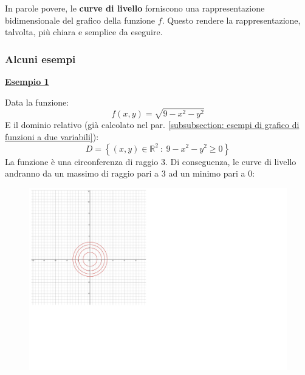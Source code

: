\documentclass[a4paper]{article}
\newcommand{\definition}[1]{\textcolor{Red3}{\textbf{#1}}}
\newcommand{\example}[1]{\textcolor{Green4}{\textbf{#1}}}
\begin{document}
	\noindent
	In parole povere, le \definition{curve di livello} forniscono una rappresentazione bidimensionale del grafico della funzione $f$. Questo rendere la rappresentazione, talvolta, più chiara e semplice da eseguire.\newpage

	\subsubsection{Alcuni esempi}\label{subsubsection: alcuni esempi}

	\begin{flushleft}
		\example{\underline{Esempio 1}}
	\end{flushleft}
	Data la funzione:
	\begin{equation*}
		f\left(x,y\right) = \sqrt{9-x^{2} -y^{2}}
	\end{equation*}
	E il dominio relativo (già calcolato nel par. \ref{subsubsection: esempi di grafico di funzioni a due variabili}):
	\begin{equation*}
		D = \left\{\left(x,y\right) \in \mathbb{R}^{2} \: : \: 9 - x^{2} - y^{2} \ge 0 \right\}
	\end{equation*}
	La funzione è una circonferenza di raggio $3$. Di conseguenza, le curve di livello andranno da un massimo di raggio pari a $3$ ad un minimo pari a $0$:
	\begin{figure}[!htp]
		\centering
		\includegraphics[width=.65\textwidth]{img/curve_di_livello-1.pdf}
	\end{figure}
	
\end{document}

